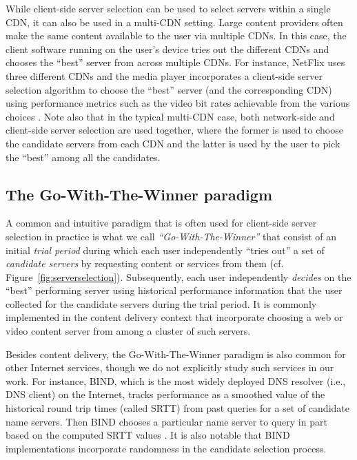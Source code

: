 \documentclass[conference]{IEEEtran}
\begin{document}
 While client-side server selection can be used to select servers within a single CDN, it can also be used in a multi-CDN setting. Large content providers often make the same content available to the user via multiple CDNs. In this case,  the client software running on the user's device tries out the different CDNs and chooses the ``best''  server  from across multiple  CDNs. For instance, NetFlix uses three different CDNs and the media player incorporates a client-side server selection algorithm to choose the ``best'' server (and the corresponding CDN) using performance metrics such as the video bit rates achievable from the various choices  \cite{adhikari2012unreeling}. Note also that in the typical multi-CDN  case, both network-side and client-side server selection are used together, where the former is used to choose the candidate servers from each CDN and the latter is used by the user to pick the ``best'' among all the candidates.  
 
  
 
 \subsection{The Go-With-The-Winner paradigm}
A common and intuitive paradigm that is often used for client-side server selection in practice is what we call  {\em ``Go-With-The-Winner''}  that consist of an initial {\em trial period}  during which each user independently ``tries out'' a set of {\em candidate servers} by requesting content or services from them (cf. Figure~\ref{fig:serverselection}). Subsequently, each user independently {\em decides} on the ``best'' performing server using historical performance information that the user collected for the candidate servers during the trial period. It is commonly implemented in the content delivery context that incorporate choosing a web or video content server from among a cluster of such servers. 

Besides content delivery, the Go-With-The-Winner paradigm is also common for other Internet services, though we do not explicitly study such services in our work.  For instance, BIND, which is the most widely deployed DNS resolver (i.e., DNS client) on the Internet,  tracks performance as a smoothed value of the historical round trip times (called SRTT) from past queries  for a set of candidate name servers. Then BIND chooses a particular name server to query in part based on the computed SRTT values \cite{liu2009dns}. It is also notable that BIND implementations incorporate randomness in the candidate selection process.
\end{document}
